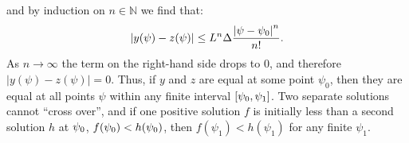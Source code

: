 and by induction on \(n\in\mathbb{N}\) we find that:
\begin{equation}
  \left|y(\psi)-z(\psi)\right| 
  \le
  L^n\Delta\frac{\left|\psi-\psi_0\right|^n}{n!}.
\end{equation}
As \(n\to\infty\) the term on the right-hand side drops to \(0\), and therefore \(|y(\psi)-z(\psi)|=0\). Thus, if \(y\) and \(z\) are equal at some point \(\psi_0\), then they are equal at all points \(\psi\) within any finite interval \([\psi_0,\psi_1]\). Two separate solutions cannot ``cross over'', and if one positive solution \(f\) is initially less than a second solution \(h\) at \(\psi_0\), \(f(\psi_0)<h(\psi_0)\), then \(f(\psi_1)<h(\psi_1)\) for any finite \(\psi_1\).  


